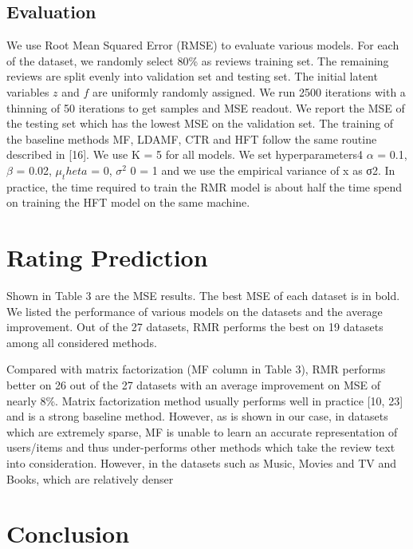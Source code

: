 \documentclass[10pt,conference]{IEEEtran}
\begin{document}
\subsection{Evaluation}
We use Root Mean Squared Error (RMSE) to evaluate various models.
For each of the dataset, we randomly select 80\% as reviews training set. The remaining reviews are split evenly into validation set and testing set. The initial latent variables $z$ and $f$ are uniformly randomly assigned. We run 2500 iterations with a thinning of 50 iterations to get samples and MSE readout. We report the MSE of the testing set which has the lowest MSE on the validation set. The training of the baseline methods MF, LDAMF, CTR and HFT follow the same routine described in [16]. We use K = 5 for all models. We set hyperparameters4 $\alpha$ = 0.1, $\beta$ = 0.02, $\mu_theta$ = 0, $\sigma^2$ 0 = 1 and we use the empirical variance of x as σ2. In practice, the time required to train the RMR model is about half the time spend on training the HFT model on the same machine.

\section{Rating Prediction}
Shown in Table 3 are the MSE results. The best MSE of each dataset is in bold. We listed the performance of various models on the datasets and the average improvement. Out of the 27 datasets, RMR performs the best on 19 datasets among all considered methods.

Compared with matrix factorization (MF column in Table 3),
RMR performs better on 26 out of the 27 datasets with an average improvement on MSE of nearly 8\%. Matrix factorization method usually performs well in practice [10, 23] and is a strong baseline method. However, as is shown in our case, in datasets which are extremely sparse, MF is unable to learn an accurate representation of users/items and thus under-performs other methods which take the review text into consideration. However, in the datasets such as Music, Movies and TV and Books, which are relatively denser



\section{Conclusion}

\newpage



\end{document}
